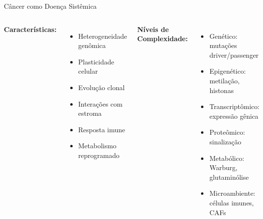 \begin{frame}{Câncer como Doença Sistêmica}

\vspace{0.3cm}

\begin{columns}
\textbf{Características:}
\begin{itemize}
    \item Heterogeneidade genômica
    \item Plasticidade celular
    \item Evolução clonal
    \item Interações com estroma
    \item Resposta imune
    \item Metabolismo reprogramado
\end{itemize}

\textbf{Níveis de Complexidade:}
\begin{itemize}
    \item Genético: mutações driver/passenger
    \item Epigenético: metilação, histonas
    \item Transcriptômico: expressão gênica
    \item Proteômico: sinalização
    \item Metabólico: Warburg, glutaminólise
    \item Microambiente: células imunes, CAFs
\end{itemize}
\end{columns}

\vspace{0.3cm}

\end{frame}

